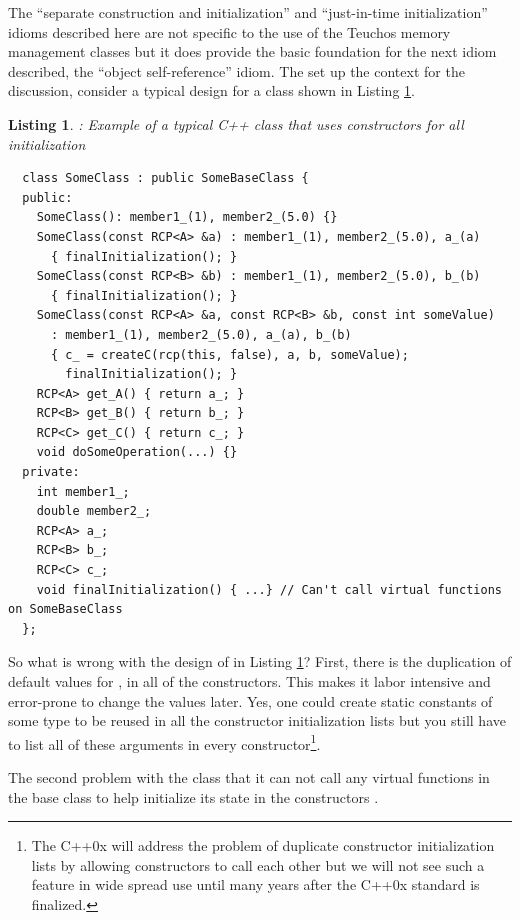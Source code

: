 \documentclass[pdf,ps2pdf,11pt]{SANDreport}
\newtheorem{listing}{Listing}
\begin{document}
The ``separate construction and initialization'' and ``just-in-time
initialization'' idioms described here are not specific to the use of
the Teuchos memory management classes but it does provide the basic
foundation for the next idiom described, the ``object self-reference''
idiom.  The set up the context for the discussion, consider a typical
design for a class shown in Listing
{}\ref{listing:sci:SomeClass-before}.


\begin{listing}: Example of a typical C++ class that uses constructors for all
initialization  \\
\label{listing:sci:SomeClass-before}
{\small\begin{verbatim}
  class SomeClass : public SomeBaseClass {
  public:
    SomeClass(): member1_(1), member2_(5.0) {}
    SomeClass(const RCP<A> &a) : member1_(1), member2_(5.0), a_(a)
      { finalInitialization(); }
    SomeClass(const RCP<B> &b) : member1_(1), member2_(5.0), b_(b)
      { finalInitialization(); }
    SomeClass(const RCP<A> &a, const RCP<B> &b, const int someValue)
      : member1_(1), member2_(5.0), a_(a), b_(b)
      { c_ = createC(rcp(this, false), a, b, someValue);
        finalInitialization(); }
    RCP<A> get_A() { return a_; }
    RCP<B> get_B() { return b_; }
    RCP<C> get_C() { return c_; }
    void doSomeOperation(...) {}
  private:
    int member1_;
    double member2_;
    RCP<A> a_;
    RCP<B> b_;
    RCP<C> c_;
    void finalInitialization() { ...} // Can't call virtual functions on SomeBaseClass
  };

\end{verbatim}}
\end{listing}


So what is wrong with the design of {} in Listing
{}\ref{listing:sci:SomeClass-before}?  First, there is the duplication
of default values for {}, {} in
all of the constructors.  This makes it labor intensive and
error-prone to change the values later.  Yes, one could create static
constants of some type to be reused in all the constructor
initialization lists but you still have to list all of these arguments
in every constructor\footnote{The C++0x will address the problem of
duplicate constructor initialization lists by allowing constructors to
call each other but we will not see such a feature in wide spread use
until many years after the C++0x standard is finalized.}.

The second problem with the class {} that it can not
call any virtual functions in the base class {} to
help initialize its state in the constructors {}\cite[Item
49]{C++CodingStandards05}.
\end{document}
